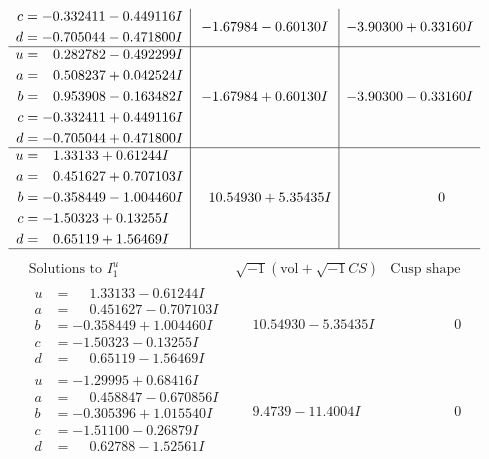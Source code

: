 \documentclass[1p]{elsarticle_modified}
\theoremstyle{definition}
\newcommand{\I}{\sqrt{-1}}
\begin{document}
$$\begin{array}{c|c|c}
\begin{aligned}
c &= -0.332411 - 0.449116 I \\
d &= -0.705044 - 0.471800 I\end{aligned}
 & -1.67984 - 0.60130 I & -3.90300 + 0.33160 I \\ \hline\begin{aligned}
u &= \phantom{-}0.282782 - 0.492299 I \\
a &= \phantom{-}0.508237 + 0.042524 I \\
b &= \phantom{-}0.953908 - 0.163482 I \\
c &= -0.332411 + 0.449116 I \\
d &= -0.705044 + 0.471800 I\end{aligned}
 & -1.67984 + 0.60130 I & -3.90300 - 0.33160 I \\ \hline\begin{aligned}
u &= \phantom{-}1.33133 + 0.61244 I \\
a &= \phantom{-}0.451627 + 0.707103 I \\
b &= -0.358449 - 1.004460 I \\
c &= -1.50323 + 0.13255 I \\
d &= \phantom{-}0.65119 + 1.56469 I\end{aligned}
 & \phantom{-}10.54930 + 5.35435 I & \phantom{-0.000000 } 0\\
 \hline 
 \end{array}$$\newpage$$\begin{array}{c|c|c}  
\text{Solutions to }I^u_{1}& \I (\text{vol} + \sqrt{-1}CS) & \text{Cusp shape}\\
 \hline 
\begin{aligned}
u &= \phantom{-}1.33133 - 0.61244 I \\
a &= \phantom{-}0.451627 - 0.707103 I \\
b &= -0.358449 + 1.004460 I \\
c &= -1.50323 - 0.13255 I \\
d &= \phantom{-}0.65119 - 1.56469 I\end{aligned}
 & \phantom{-}10.54930 - 5.35435 I & \phantom{-0.000000 } 0 \\ \hline\begin{aligned}
u &= -1.29995 + 0.68416 I \\
a &= \phantom{-}0.458847 - 0.670856 I \\
b &= -0.305396 + 1.015540 I \\
c &= -1.51100 - 0.26879 I \\
d &= \phantom{-}0.62788 - 1.52561 I\end{aligned}
 & \phantom{-}9.4739 - 11.4004 I & \phantom{-0.000000 } 0 \\ \hline\begin{aligned}

\end{aligned}
\end{array}$$
\end{document}
